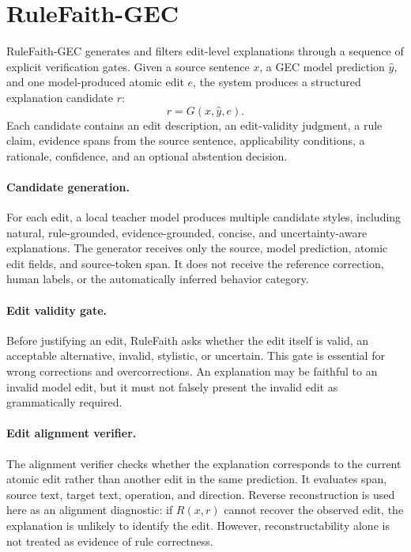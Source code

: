 \section{RuleFaith-GEC}

RuleFaith-GEC generates and filters edit-level explanations through a sequence of explicit verification gates. Given a source sentence \(x\), a GEC model prediction \(\hat{y}\), and one model-produced atomic edit \(e\), the system produces a structured explanation candidate \(r\):
\[
r = G(x,\hat{y},e).
\]
Each candidate contains an edit description, an edit-validity judgment, a rule claim, evidence spans from the source sentence, applicability conditions, a rationale, confidence, and an optional abstention decision.



\paragraph{Candidate generation.}
For each edit, a local teacher model produces multiple candidate styles, including natural, rule-grounded, evidence-grounded, concise, and uncertainty-aware explanations. The generator receives only the source, model prediction, atomic edit fields, and source-token span. It does not receive the reference correction, human labels, or the automatically inferred behavior category.

\paragraph{Edit validity gate.}
Before justifying an edit, RuleFaith asks whether the edit itself is valid, an acceptable alternative, invalid, stylistic, or uncertain. This gate is essential for wrong corrections and overcorrections. An explanation may be faithful to an invalid model edit, but it must not falsely present the invalid edit as grammatically required.

\paragraph{Edit alignment verifier.}
The alignment verifier checks whether the explanation corresponds to the current atomic edit rather than another edit in the same prediction. It evaluates span, source text, target text, operation, and direction. Reverse reconstruction is used here as an alignment diagnostic: if \(R(x,r)\) cannot recover the observed edit, the explanation is unlikely to identify the edit. However, reconstructability alone is not treated as evidence of rule correctness.

